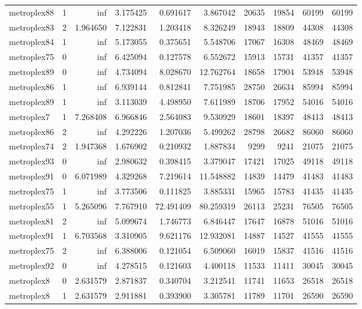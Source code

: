 \begin{longtable}{|l|r|r|r|r|r|r|r|r|r|}
metroplex88 & 1 & inf & 3.175425 & 0.691617 & 3.867042 & 20635 & 19854 & 60199 & 60199 \\
metroplex83 & 2 & 1.964650 & 7.122831 & 1.203418 & 8.326249 & 18943 & 18809 & 44308 & 44308 \\
metroplex84 & 1 & inf & 5.173055 & 0.375651 & 5.548706 & 17067 & 16308 & 48469 & 48469 \\
metroplex75 & 0 & inf & 6.425094 & 0.127578 & 6.552672 & 15913 & 15731 & 41357 & 41357 \\
metroplex89 & 0 & inf & 4.734094 & 8.028670 & 12.762764 & 18658 & 17904 & 53948 & 53948 \\
metroplex86 & 1 & inf & 6.939144 & 0.812841 & 7.751985 & 28750 & 26634 & 85994 & 85994 \\
metroplex89 & 1 & inf & 3.113039 & 4.498950 & 7.611989 & 18706 & 17952 & 54016 & 54016 \\
metroplex7 & 1 & 7.268408 & 6.966846 & 2.564083 & 9.530929 & 18601 & 18397 & 48413 & 48413 \\
metroplex86 & 2 & inf & 4.292226 & 1.207036 & 5.499262 & 28798 & 26682 & 86060 & 86060 \\
metroplex74 & 2 & 1.947368 & 1.676902 & 0.210932 & 1.887834 & 9299 & 9241 & 21075 & 21075 \\
metroplex93 & 0 & inf & 2.980632 & 0.398415 & 3.379047 & 17421 & 17025 & 49118 & 49118 \\
metroplex91 & 0 & 6.071989 & 4.329268 & 7.219614 & 11.548882 & 14839 & 14479 & 41483 & 41483 \\
metroplex75 & 1 & inf & 3.773506 & 0.111825 & 3.885331 & 15965 & 15783 & 41435 & 41435 \\
metroplex55 & 1 & 5.265096 & 7.767910 & 72.491409 & 80.259319 & 26113 & 25231 & 76505 & 76505 \\
metroplex81 & 2 & inf & 5.099674 & 1.746773 & 6.846447 & 17647 & 16878 & 51016 & 51016 \\
metroplex91 & 1 & 6.703568 & 3.310905 & 9.621176 & 12.932081 & 14887 & 14527 & 41555 & 41555 \\
metroplex75 & 2 & inf & 6.388006 & 0.121054 & 6.509060 & 16019 & 15837 & 41516 & 41516 \\
metroplex92 & 0 & inf & 4.278515 & 0.121603 & 4.400118 & 11533 & 11411 & 30045 & 30045 \\
metroplex8 & 0 & 2.631579 & 2.871837 & 0.340704 & 3.212541 & 11741 & 11653 & 26518 & 26518 \\
metroplex8 & 1 & 2.631579 & 2.911881 & 0.393900 & 3.305781 & 11789 & 11701 & 26590 & 26590 \\

\end{longtable}
